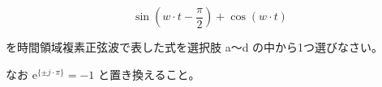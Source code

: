 \[
\sin \left ( w \cdot t - \frac{\pi}{2} \right ) + \cos ( w \cdot t )
\]

\bigskip
\noindent を時間領域複素正弦波で表した式を選択肢 a〜d の中から1つ選びなさい。

\noindent なお $\textrm{e}^{\{ \pm j \cdot \pi \}} = -1$ と置き換えること。
